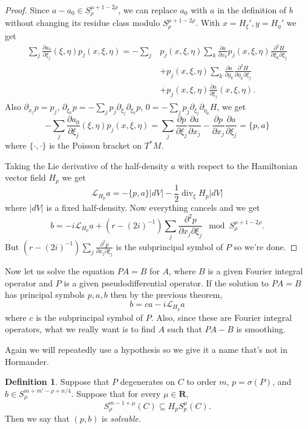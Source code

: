 \documentclass[reqno,12pt,letterpaper]{amsart}
\newcommand{\RR}{\mathbf{R}}
\newcommand{\dfn}[1]{\emph{#1}\index{#1}}
\theoremstyle{definition}
\newtheorem{definition}[theorem]{Definition}
\begin{document}
\begin{proof}
Since $a - a_0 \in S^{\mu + 1 - 2\rho}_\rho$, we can replace $a_0$ with $a$ in the definition of $b$ without changing its residue class modulo $S^{\mu + 1 - 2\rho}_\rho$.
With $x = H_\xi', y = H_\eta'$ we get
\begin{align*}
\sum_j \frac{\partial a_0}{\partial \xi_j}(\xi, \eta) p_j(x, \xi, \eta) = -\sum_j &p_j(x, \xi, \eta) \sum_k \frac{\partial a}{\partial x_k} p_j(x, \xi, \eta) \frac{\partial^2 H}{\partial \xi_k \partial \xi_j} \\
&+ p_j(x, \xi, \eta) \sum_k \frac{\partial a}{\partial y_k} \frac{\partial^2 H}{\partial \eta_k \partial \xi_j} \\
&+ p_j(x, \xi, \eta) \frac{\partial a}{\partial \xi_j}(x, \xi, \eta).
\end{align*}
Also $\partial_{x_j} p = p_j$, $\partial_{\xi_k} p = -\sum_j p_j \partial_{\xi_j} \partial_{\xi_k} p$, $0 = -\sum_j p_j \partial_{\xi_j} \partial_{\eta_k} H$, we get
$$-\sum_j \frac{\partial a_0}{\partial \xi_j}(\xi, \eta) p_j(x, \xi, \eta) = \sum_j \frac{\partial p}{\partial \xi_j}\frac{\partial a}{\partial x_j} - \frac{\partial p}{\partial x_j} \frac{\partial a}{\partial \xi_j} = \{p, a\}$$
where $\{\cdot, \cdot\}$ is the Poisson bracket on $T^* M$.

Taking the Lie derivative of the half-density $a$ with respect to the Hamiltonian vector field $H_p$ we get
$$\mathcal L_{H_p} a = - \{p, a\}|dV| - \frac{1}{2} \operatorname{div}_\xi H_p|dV|$$
where $|dV|$ is a fixed half-density.
Now everything cancels and we get
$$b = -i \mathcal L_{H_p}a + (r - (2i)^{-1})\sum_j \frac{\partial^2 p}{\partial x_j \partial \xi_j} \mod S^{\mu + 1 - 2\rho}_\rho.$$
But $(r - (2i)^{-1})\sum_j \frac{\partial^2 p}{\partial x_j \partial \xi_j}$ is the subprincipal symbol of $P$ so we're done.
\end{proof}

Now let us solve the equation $PA = B$ for $A$, where $B$ is a given Fourier integral operator and $P$ is a given pseudodifferential operator.
If the solution to $PA = B$ has principal symbols $p,a,b$ then by the previous theorem,
$$b = ca - i\mathcal L_{H_p}a$$
where $c$ is the subprincipal symbol of $P$.
Also, since these are Fourier integral operators, what we really want is to find $A$ such that $PA - B$ is smoothing.

Again we will repeatedly use a hypothesis so we give it a name that's not in Hormander.

\begin{definition}
Suppose that $P$ degenerates on $C$ to order $m$, $p = \sigma(P)$, and $b \in S^{m + m' - \rho + n/4}_\rho$.
Suppose that for every $\mu \in \RR$,
$$S^{m - 1 + \mu}_\rho(C) \subseteq H_p S^\mu_p(C).$$
Then we say that $(p, b)$ is \dfn{solvable}.
\end{definition}
\end{document}
